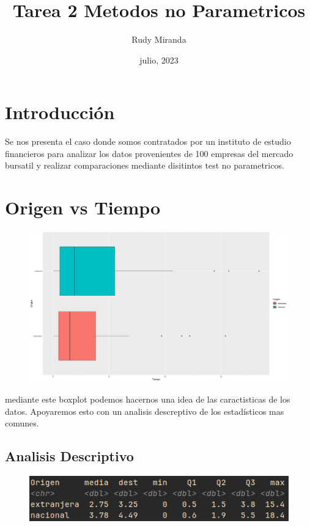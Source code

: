 \documentclass{article}
\title{Tarea 2 Metodos no Parametricos}
\author{Rudy Miranda}
\date{julio, 2023}
\begin{document}
    \maketitle 
    \tableofcontents

    \section{Introducci\'on}
    Se nos presenta el caso donde somos contratados por un instituto de estudio financieros para analizar los datos provenientes de 100 empresas del mercado bursatil y realizar comparaciones mediante disitintos test no parametricos.

    \section{Origen vs Tiempo}

    \begin{figure}[ht]
        \centering
        \includegraphics[width=0.7\linewidth]{../imgs/img1.png}
    \end{figure}

    mediante este boxplot podemos hacernos una idea de las caractisticas de los datos. Apoyaremos esto con un analisis descreptivo de los estad\'isticos mas comunes.
    
    \subsection{Analisis Descriptivo}

    \begin{figure}[ht]
        \centering
        \includegraphics[scale=0.7]{../imgs/screenshot1.png}
    \end{figure}
\end{document}

